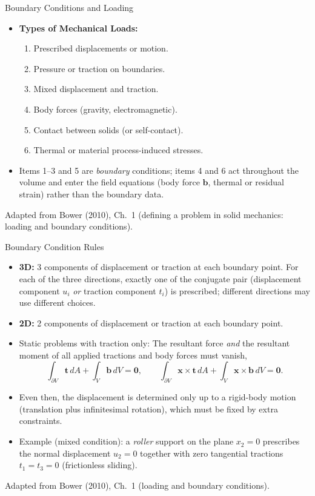 \documentclass[aspectratio=169,11pt]{beamer}
\begin{document}
\begin{frame}{Boundary Conditions and Loading}
  \begin{itemize}
    \item \textbf{Types of Mechanical Loads:}
      \begin{enumerate}
        \item Prescribed displacements or motion.
        \item Pressure or traction on boundaries.
        \item Mixed displacement and traction.
        \item Body forces (gravity, electromagnetic).
        \item Contact between solids (or self-contact).
        \item Thermal or material process-induced stresses.
      \end{enumerate}
    \item Items 1--3 and 5 are \emph{boundary} conditions; items 4 and 6 act throughout the volume and enter the field equations (body force $\mathbf{b}$, thermal or residual strain) rather than the boundary data.
  \end{itemize}
  \vspace{2mm}
  {\tiny\color{DarkGray}Adapted from Bower (2010), Ch.~1 (defining a problem in solid mechanics: loading and boundary conditions).\par}
\end{frame}

\begin{frame}{Boundary Condition Rules}
  \begin{itemize}
    \item \textbf{3D:} 3 components of displacement or traction at each boundary point. For each of the three directions, exactly one of the conjugate pair (displacement component $u_i$ \emph{or} traction component $t_i$) is prescribed; different directions may use different choices.
    \item \textbf{2D:} 2 components of displacement or traction at each boundary point.
    \item Static problems with traction only: The resultant force \emph{and} the resultant moment of all applied tractions and body forces must vanish,
      \[
        \int_{\partial V} \mathbf{t}\,dA + \int_V \mathbf{b}\,dV = \mathbf{0}, \qquad
        \int_{\partial V} \mathbf{x}\times\mathbf{t}\,dA + \int_V \mathbf{x}\times\mathbf{b}\,dV = \mathbf{0}.
      \]
    \item Even then, the displacement is determined only up to a rigid-body motion (translation plus infinitesimal rotation), which must be fixed by extra constraints.
    \item Example (mixed condition): a \emph{roller} support on the plane $x_2 = 0$ prescribes the normal displacement $u_2 = 0$ together with zero tangential tractions $t_1 = t_3 = 0$ (frictionless sliding).
  \end{itemize}
  \vspace{1mm}
  {\tiny\color{DarkGray}Adapted from Bower (2010), Ch.~1 (loading and boundary conditions).\par}
\end{frame}
\end{document}
